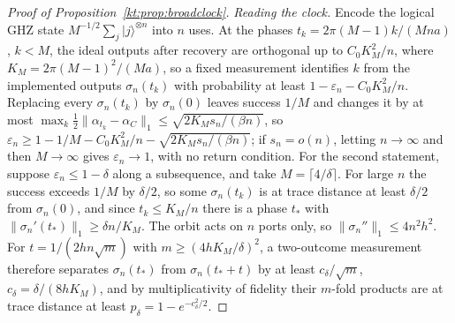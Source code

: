 \begin{proof}[Proof of Proposition~\ref{kt:prop:broadclock}]
\emph{Reading the clock.} Encode the logical GHZ state $M^{-1/2}\sum_j|j\rangle^{\otimes n}$ into $n$ uses. At the phases $t_k=2\pi(M-1)k/(Mna)$, $k<M$, the ideal outputs after recovery are orthogonal up to $C_0K_M^2/n$, where $K_M=2\pi(M-1)^2/(Ma)$, so a fixed measurement identifies $k$ from the implemented outputs $\sigma_n(t_k)$ with probability at least $1-\varepsilon_n-C_0K_M^2/n$. Replacing every $\sigma_n(t_k)$ by $\sigma_n(0)$ leaves success $1/M$ and changes it by at most $\max_k\tfrac12\|\alpha_{t_k}-\alpha_C\|_1\le\sqrt{2K_Ms_n/(\beta n)}$, so $\varepsilon_n\ge1-1/M-C_0K_M^2/n-\sqrt{2K_Ms_n/(\beta n)}$; if $s_n=o(n)$, letting $n\to\infty$ and then $M\to\infty$ gives $\varepsilon_n\to1$, with no return condition. For the second statement, suppose $\varepsilon_n\le1-\delta$ along a subsequence, and take $M=\lceil4/\delta\rceil$. For large $n$ the success exceeds $1/M$ by $\delta/2$, so some $\sigma_n(t_k)$ is at trace distance at least $\delta/2$ from $\sigma_n(0)$, and since $t_k\le K_M/n$ there is a phase $t_*$ with $\|\sigma_n'(t_*)\|_1\ge\delta n/K_M$. The orbit acts on $n$ ports only, so $\|\sigma_n''\|_1\le4n^2h^2$. For $t=1/(2hn\sqrt m)$ with $m\ge(4hK_M/\delta)^2$, a two-outcome measurement therefore separates $\sigma_n(t_*)$ from $\sigma_n(t_*+t)$ by at least $c_\delta/\sqrt m$, $c_\delta=\delta/(8hK_M)$, and by multiplicativity of fidelity their $m$-fold products are at trace distance at least $p_\delta=1-e^{-c_\delta^2/2}$.


\end{proof}

